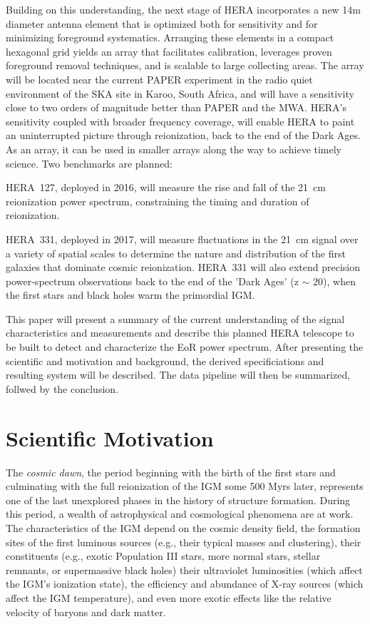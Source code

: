 \documentclass[ars]{copernicus}
\begin{document}
Building on this understanding, the next stage of HERA incorporates a new
14m diameter antenna element that is optimized both for sensitivity
and for minimizing foreground systematics.  Arranging these elements
in a compact hexagonal grid yields an array that facilitates
calibration, leverages proven foreground removal techniques, and is
scalable to large collecting areas. The array will be located near the current PAPER
experiment
in the radio quiet environment of the SKA site in Karoo, South Africa,
and will have a sensitivity close to two orders of magnitude better than
PAPER and the MWA.  HERA's sensitivity coupled with broader frequency coverage, 
will enable HERA to paint an
uninterrupted picture through reionization, back to the end of the
Dark Ages.  As an array, it can be used in smaller arrays along the way to 
achieve timely science.  Two benchmarks are planned:

HERA~127, deployed in 2016, will measure the rise and fall of the
21~cm reionization power spectrum, constraining the timing and
duration of reionization.

HERA~331, deployed in 2017, will measure fluctuations in the 21~cm
signal over a variety of spatial scales to determine the nature and
distribution of the first galaxies that dominate cosmic
reionization. HERA~331 will also extend precision power-spectrum
observations back to the end of the 'Dark Ages' (z $\sim$ 20), when
the first stars and black holes warm the primordial IGM.

This paper will present a summary of the current understanding
of the signal characteristics and measurements and describe this planned
HERA telescope to be built to detect and characterize the EoR power
spectrum.  After presenting the scientific and motivation and background, the
derived specificiations and resulting system will be described.  The data pipeline
will then be summarized, follwed by the conclusion.

\section{Scientific Motivation}
\label{sec:science}

The {\it cosmic dawn}, the period beginning with the birth of the first stars and
culminating with the full reionization of the IGM some 500 Myrs later, represents one
of the last unexplored phases in the history of structure formation. During this
period, a wealth of astrophysical and cosmological phenomena are at work. The
characteristics of the IGM depend on the cosmic density field, the formation sites of
the first luminous sources (e.g., their typical masses and clustering), their
constituents (e.g., exotic Population III stars, more normal stars, stellar remnants,
or supermassive black holes) their ultraviolet luminosities (which affect the IGM's
ionization state), the efficiency and abundance of X-ray sources (which affect the
IGM temperature), and even more exotic effects like the relative velocity of baryons
and dark matter.
\end{document}
